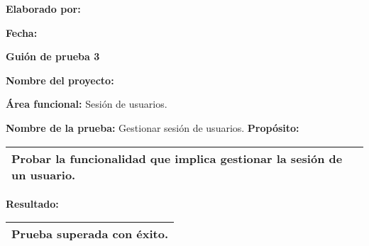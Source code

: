 \begin{minipage}[t]{0.45\textwidth}
	\begin{flushleft}
		\textbf{Elaborado por:} \nombre
	\end{flushleft}
\end{minipage}
\begin{minipage}[t]{0.45\textwidth}
	\begin{flushright}
		\begin{center}
			\textbf{Fecha:} \fecha
		\end{center}
	\end{flushright}
\end{minipage}
\vfill
\newpage
\begin{center}
	\textbf{Gui\'{o}n de prueba 3}
\end{center}

\textbf{Nombre del proyecto:} \proyecto

\textbf{\'{A}rea funcional:} Sesi\'{o}n de usuarios.

\textbf{Nombre de la prueba:} Gestionar sesi\'{o}n de usuarios.
\vfill
\textbf{Prop\'{o}sito:}
\begin{table}[h]
	\centering
	\setlength{\extrarowheight}{\altocelda}
	\begin{tabularx}{\anchotabla}{|X|}
		\hline
		Probar la funcionalidad que implica gestionar la sesi\'{o}n de un usuario.\\ \hline
	\end{tabularx}
\end{table}

\textbf{Resultado:}
\begin{table}[h]
	\centering
	\setlength{\extrarowheight}{\altocelda}
	\begin{tabularx}{\anchotabla}{|X|}
		\hline
		Prueba superada con \'{e}xito.\\ \hline
	\end{tabularx}
\end{table}


